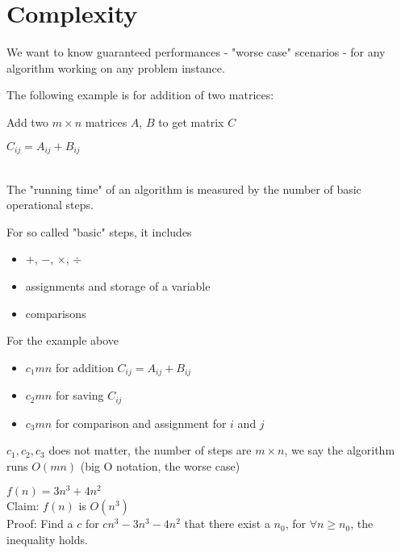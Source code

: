 		\section{Complexity}
			 We want to know guaranteed performances - "worse case" scenarios -  for any algorithm working on any problem instance.

			The following example is for addition of two matrices: \\
			\begin{algorithm}[!ht]
				\caption{Add two $m \times n$ matrices $A$, $B$ to get matrix $C$}
				\begin{algorithmic}
							\STATE $C_{ij} = A_{ij} + B_{ij}$
						\ENDFOR
					\ENDFOR
				\end{algorithmic}				
			\end{algorithm}\\

			The "running time" of an algorithm is measured by the number of basic operational steps.

			For so called "basic" steps, it includes
			\begin{itemize}
				\item $+$, $-$, $\times$, $\div$
				\item assignments and storage of a variable
				\item comparisons
			\end{itemize}

			For the example above
			\begin{itemize}
				\item $c_1 m n$ for addition $C_{ij} = A_{ij} + B_{ij}$
				\item $c_2 m n$ for saving $C_{ij}$
				\item $c_3 m n$ for comparison and assignment for $i$ and $j$
			\end{itemize}
			$c_1, c_2, c_3$ does not matter, the number of steps are $m \times n$, we say the algorithm runs $O(mn)$ (big O notation, the worse case)

			\begin{example}
				$f(n) = 3n^3 + 4n^2$\\
				Claim: $f(n)$ is $O(n^3)$\\
				Proof: Find a $c$ for $cn^3 - 3n^3 - 4n^2$ that there exist a $n_0$, for $\forall n \ge n_0$, the inequality holds.
			\end{example}

